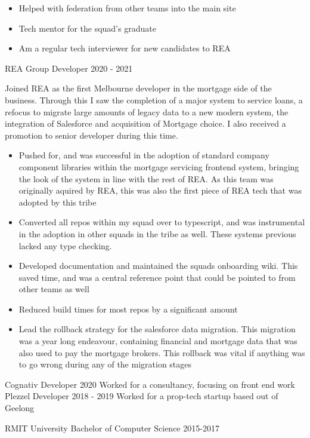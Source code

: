 \documentclass[8pt]{developercv}
\begin{document}
\begin{minipage}[t]{1.0\textwidth}
\begin{entrylist}
{\begin{itemize}
					\item Helped with federation from other teams into the main site
					\item Tech mentor for the squad's graduate
					\item Am a regular tech interviewer for new candidates to REA
				\end{itemize}								
				}
			\entry
				{REA Group}
				{Developer}
				{2020 - 2021}
				{Joined REA as the first Melbourne developer in the mortgage side of the business. Through this I saw the completion of a major system to service loans, a refocus to migrate large amounts of legacy data to a new modern system, the integration of Salesforce and acquisition of Mortgage choice. I also received a promotion to senior developer during this time.
				\begin{itemize}
					\item Pushed for, and was successful in the adoption of standard company component libraries within the mortgage servicing frontend system, bringing the look of the system in line with the rest of REA. As this team was originally aquired by REA, this was also the first piece of REA tech that was adopted by this tribe
					\item Converted all repos within my squad over to typescript, and was instrumental in the adoption in other squads in the tribe as well. These systems previous lacked any type checking.
					\item Developed documentation and maintained the squads onboarding wiki. This saved time, and was a central reference point that could be pointed to  from other teams as well
					\item Reduced  build times for most repos by a significant amount
					\item Lead the rollback strategy for the salesforce data migration. This migration was a year long endeavour, containing financial and mortgage data that was also used to pay the mortgage brokers. This rollback was vital if anything was to go wrong during any of the migration stages
				\end{itemize}								
				}
			\entry
				{Cognativ}
				{Developer}
				{2020}
				{Worked for a consultancy, focusing on front end work}
			\entry
				{Plezzel}
				{Developer}
				{2018 - 2019}
				{Worked for a prop-tech startup based out of Geelong}
		\end{entrylist}			
		\begin{entrylist}	%
			\entry
				{RMIT University}
				{Bachelor of Computer Science}
				{2015-2017}
				{}
		\end{entrylist}
	\end{minipage}
\begin{minipage}[t]{0.05\textwidth}
\hphantom{0.1}
\end{minipage}
\end{document}
